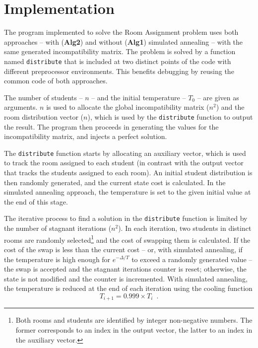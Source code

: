 \section{Implementation}
\label{sec:implementation}

The program implemented to solve the Room Assignment problem uses both approaches -- with (\textbf{Alg2}) and without (\textbf{Alg1}) simulated annealing -- with the same generated incompatibility matrix. The problem is solved by a function named \texttt{distribute} that is included at two distinct points of the code with different preprocessor environments. This benefits debugging by reusing the common code of both approaches.

The number of students -- $n$ -- and the initial temperature -- $T_{0}$ -- are given as arguments. $n$ is used to allocate the global incompatibility matrix ($n^{2}$) and the room distribution vector ($n$), which is used by the \texttt{distribute} function to output the result. The program then proceeds in generating the values for the incompatibility matrix, and injects a perfect solution.

The \texttt{distribute} function starts by allocating an auxiliary vector, which is used to track the room assigned to each student (in contrast with the output vector that tracks the students assigned to each room). An initial student distribution is then randomly generated, and the current state cost is calculated. In the simulated annealing approach, the temperature is set to the given initial value at the end of this stage.

The iterative process to find a solution in the \texttt{distribute} function is limited by the number of stagnant iterations ($n^{2}$). In each iteration, two students in distinct rooms are randomly selected\footnote{Both rooms and students are identified by integer non-negative numbers. The former corresponds to an index in the output vector, the latter to an index in the auxiliary vector.} and the cost of swapping them is calculated. If the cost of the swap is less than the current cost -- or, with simulated annealing, if the temperature is high enough for $e^{-\Delta/T}$ to exceed a randomly generated value -- the swap is accepted and the stagnant iterations counter is reset; otherwise, the state is not modified and the counter is incremented. With simulated annealing, the temperature is reduced at the end of each iteration using the cooling function $$T_{i+1}=0.999\times T_{i}\enspace.$$

